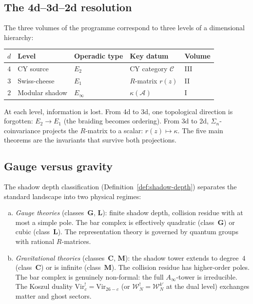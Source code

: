 \documentclass[11pt,reqno]{amsart}
\theoremstyle{definition}
\theoremstyle{remark}
\newcommand{\cA}{\mathcal{A}}
\newcommand{\Vir}{\mathrm{Vir}}
\numberwithin{equation}{section}
\begin{document}
\subsection{The 4d--3d--2d resolution}
\label{ssec:4d-3d-2d}

The three volumes of the programme correspond to three levels
of a dimensional hierarchy:

\begin{center}
\renewcommand{\arraystretch}{1.3}
\begin{tabular}{cllll}
\toprule
\textbf{$d$} & \textbf{Level} & \textbf{Operadic type}
 & \textbf{Key datum} & \textbf{Volume} \\
\midrule
$4$ & CY source & $E_2$
 & CY category $\mathcal{C}$ & III \\
$3$ & Swiss-cheese & $E_1$
 & $R$-matrix $r(z)$ & II \\
$2$ & Modular shadow & $E_\infty$
 & $\kappa(\cA)$ & I \\
\bottomrule
\end{tabular}
\end{center}

\noindent
At each level, information is lost. From 4d to 3d, one
topological direction is forgotten: $E_2 \to E_1$ (the
braiding becomes ordering). From 3d to 2d,
$\Sigma_n$-coinvariance projects the $R$-matrix to a scalar:
$r(z) \mapsto \kappa$. The five main theorems are the
invariants that survive both projections.

\subsection{Gauge versus gravity}
\label{ssec:gauge-vs-gravity}

The shadow depth classification
(Definition~\ref{def:shadow-depth}) separates the standard
landscape into two physical regimes:

\begin{enumerate}[(a)]
\item \emph{Gauge theories} (classes~$\mathbf{G}$,
 $\mathbf{L}$): finite shadow depth, collision residue with
 at most a simple pole.
 The bar complex is effectively quadratic (class~$\mathbf{G}$)
 or cubic (class~$\mathbf{L}$).
 The representation theory is governed by quantum groups with
 rational $R$-matrices.

\item \emph{Gravitational theories} (classes~$\mathbf{C}$,
 $\mathbf{M}$): the shadow tower extends to degree~$4$
 (class~$\mathbf{C}$) or is infinite (class~$\mathbf{M}$).
 The collision residue has higher-order poles. The bar complex
 is genuinely non-formal: the full $A_\infty$-tower is
 irreducible. The Koszul duality
 $\Vir_c^! = \Vir_{26-c}$ (or
 $\mathcal{W}_N^! = \mathcal{W}_N^{k'}$ at the dual level)
 exchanges matter and ghost sectors.
\end{enumerate}
\end{document}
